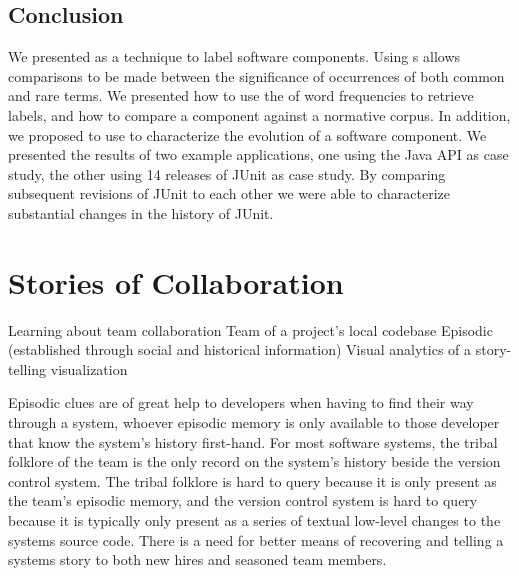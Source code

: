 \documentclass[10pt]{book}
\begin{document}


\section{Conclusion}\label{eventually}

We presented \loglr as a technique to label software components. Using \loglr{}s allows comparisons to be made between the significance of occurrences of both common and rare terms. We presented how to use the \loglr of word frequencies to retrieve labels, and how to compare a component against a normative corpus. In addition, we proposed to use \loglrs to characterize the evolution of a software component. We presented the results of two example applications, one using the Java API as case study, the other using 14 releases of JUnit as case study. By comparing subsequent revisions of JUnit to each other we were able to characterize substantial changes in the history of JUnit.


\chapter{Stories of Collaboration}
\label{the chapter on chronia}

\infobox
	{Learning about team collaboration}
	{Team of a project's local codebase}
	{Episodic (established through social and historical information)}
	{Visual analytics of a story-telling visualization}

Episodic clues are of great help to developers when having to find their way through a system, whoever episodic memory is only available to those developer that know the system's history first-hand. For most software systems, the tribal folklore of the team is the only record on the system's history beside the version control system. The tribal folklore is hard to query because it is only present as the team's episodic memory, and the version control system is hard to query because it is typically only present as a series of textual low-level changes to the systems source code. There is a need for better means of recovering and telling a systems story to both new hires and seasoned team members.
\end{document}
